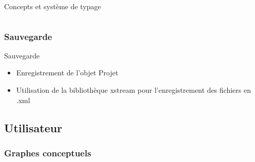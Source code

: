 \documentclass[11pt]{beamer}
\begin{document}
\begin{frame}{Concepts et système de typage}
\begin{columns}
\begin{column}{6cm}
\end{column}

\end{columns}
\end{frame}





\subsubsection{Sauvegarde}
\begin{frame}{Sauvegarde}
\begin{itemize}[<+->]
\item Enregistrement de l'objet Projet
\item Utilisation de la bibliothèque xstream pour l'enregistrement des fichiers en .xml
\end{itemize}
\end{frame}


\subsection{Utilisateur}

\subsubsection{Graphes conceptuels}
\end{document}
